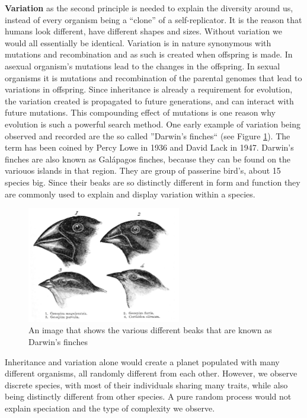 \documentclass[12pt,oneside,listof=totoc,paper=a4,headings=small]{scrbook}
\begin{document}
\newpage
\textbf{Variation} as the second principle is needed to explain the diversity around us, instead of every organism being a ``clone'' of a self-replicator. It is the reason that humans look different, have different shapes and sizes. Without variation we would all essentially be identical. Variation is in nature synonymous with mutations and recombination and as such is created when offspring is made. In asexual organism's mutations lead to the changes in the offspring. In sexual organisms it is mutations and recombination of the parental genomes that lead to variations in offspring. Since inheritance is already a requirement for evolution, the variation created is propagated to future generations, and can interact with future mutations. This compounding effect of mutations is one reason why evolution is such a powerful search method. One early example of variation being observed and recorded are the so called ''Darwin's finches`` (see Figure \ref{fig:darwinsfinches}). The term has been coined by Percy Lowe in 1936 and David Lack in 1947. Darwin's finches are also known as Galápagos finches, because they can be found on the variouos islands in that region. They are group of passerine bird's, about 15 species big. Since their beaks are so distinctly different in form and function they are commonly used to explain and display variation within a species. 

\begin{figure}[h!]
\centering
\includegraphics[width=0.6\textwidth,height=0.6\textheight,keepaspectratio]{images/variation_Darwin's_finches_by_Gould.jpg}
\caption{An image that shows the various different beaks that are known as Darwin's finches~\cite{DarwinsFinches}}
\label{fig:darwinsfinches}
\end{figure}


Inheritance and variation alone would create a planet populated with many different organisms, all randomly different from each other. However, we observe discrete species, with most of their individuals sharing many traits, while also being distinctly different from other species. A pure random process would not explain speciation and the type of complexity we observe.
\end{document}
